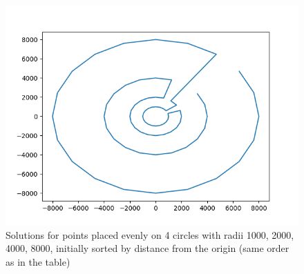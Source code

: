 \documentclass[12pt]{article}
\begin{document}
\begin{figure}
\includegraphics[scale=0.5]{20CirclesMyHeuristic.png}
\caption{Solutions for points placed evenly on 4 circles with radii 1000, 2000, 4000, 8000, initially sorted by distance from the origin (same order as in the table)}
\end{figure}
\end{document}
